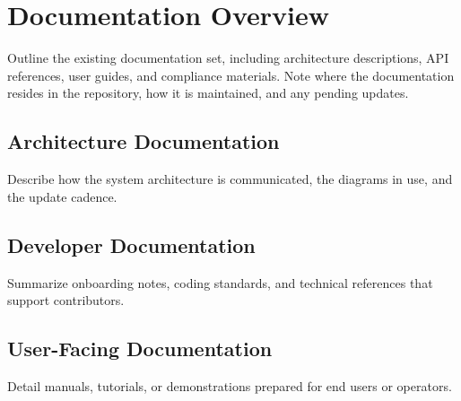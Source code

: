 \section{Documentation Overview}

Outline the existing documentation set, including architecture descriptions, API references, user guides, and compliance materials. Note where the documentation resides in the repository, how it is maintained, and any pending updates.

\subsection{Architecture Documentation}
Describe how the system architecture is communicated, the diagrams in use, and the update cadence.

\subsection{Developer Documentation}
Summarize onboarding notes, coding standards, and technical references that support contributors.

\subsection{User-Facing Documentation}
Detail manuals, tutorials, or demonstrations prepared for end users or operators.
